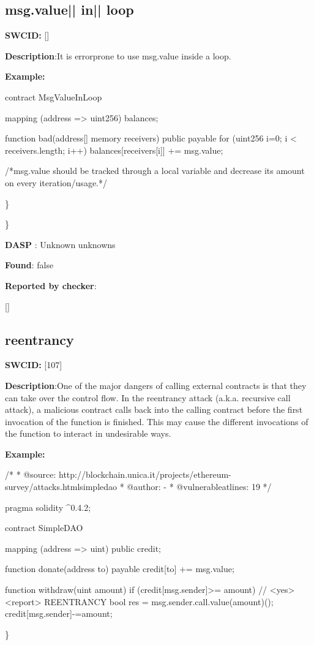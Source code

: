 \documentclass{article}
\begin{document}
\subsection{msg.value{|\textunderscore| }in{|\textunderscore| }loop} 
\textbf{SWC{\textunderscore }ID:} []

\textbf{Description}:It is error{\textendash}prone to use msg.value inside a loop.


\textbf{Example:} 
\begin{ffcode} 

contract MsgValueInLoop{
    mapping (address => uint256) balances;

    function bad(address[] memory receivers) public payable {
        for (uint256 i=0; i < receivers.length; i++) {
            balances[receivers[i]] += msg.value;
        }
    }
}

 /*msg.value should be tracked through a local variable and decrease its amount on every iteration/usage.*/ 

\end{ffcode} 
\} 

\} 

\textbf{DASP} : Unknown unknowns

\textbf{Found}: false

\textbf{Reported by checker}: 
\begin{ffcode} 

[]
\end{ffcode} 
\subsection{reentrancy} 
\textbf{SWC{\textunderscore }ID:} [107]

\textbf{Description}:One of the major dangers of calling external contracts is that they can take over the control flow. In the reentrancy attack (a.k.a. recursive call attack), a malicious contract calls back into the calling contract before the first invocation of the function is finished. This may cause the different invocations of the function to interact in undesirable ways.


\textbf{Example:} 
\begin{ffcode} 

/*
* @source: http://blockchain.unica.it/projects/ethereum-survey/attacks.htmlsimpledao
* @author: -
* @vulnerable\textunderscore at\textunderscore lines: 19
*/

pragma solidity ^0.4.2;

contract SimpleDAO {
  mapping (address => uint) public credit;

  function donate(address to) payable {
    credit[to] += msg.value;
  }

  function withdraw(uint amount) {
    if (credit[msg.sender]>= amount) {
      // <yes> <report> REENTRANCY
      bool res = msg.sender.call.value(amount)();
      credit[msg.sender]-=amount;
    }
  }
}

\end{ffcode} 
\} 
\end{document}
